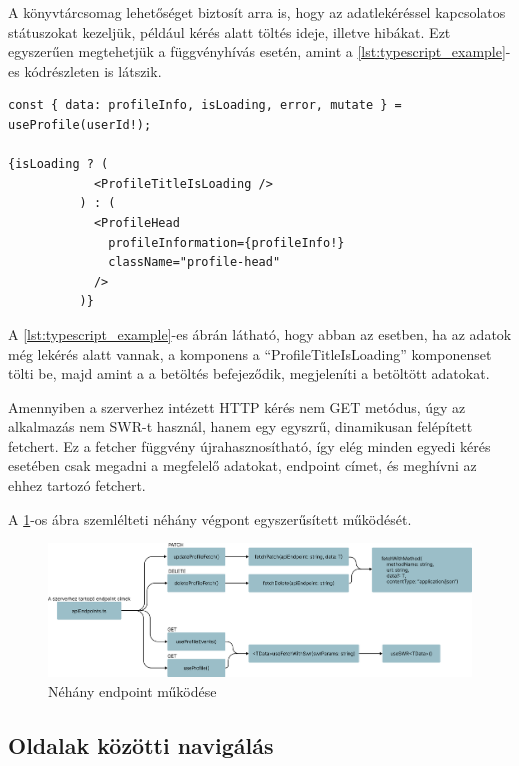 A könyvtárcsomag lehetőséget biztosít arra is, hogy az adatlekéréssel kapcsolatos státuszokat kezeljük, például kérés alatt töltés ideje, illetve hibákat. Ezt egyszerűen megtehetjük a függvényhívás esetén, amint a \ref{lst:typescript_example}-es kódrészleten is látszik.

\clearpage

\begin{lstlisting}[caption={SWR használata profil adatok lekérésére}, label={lst:typescript_example}]
const { data: profileInfo, isLoading, error, mutate } = useProfile(userId!);

{isLoading ? (
            <ProfileTitleIsLoading />
          ) : (
            <ProfileHead
              profileInformation={profileInfo!}
              className="profile-head"
            />
          )}
\end{lstlisting}

A \ref{lst:typescript_example}-es ábrán látható, hogy abban az esetben, ha az adatok még lekérés alatt vannak, a komponens a ``ProfileTitleIsLoading'' komponenset tölti be, majd amint a a betöltés befejeződik, megjeleníti a betöltött adatokat.

Amennyiben a szerverhez intézett HTTP kérés nem GET metódus, úgy az alkalmazás nem SWR-t használ, hanem egy egyszrű, dinamikusan felépített fetchert. Ez a fetcher függvény újrahasznosítható, így elég minden egyedi kérés esetében csak megadni a megfelelő adatokat, endpoint címet, és meghívni az ehhez tartozó fetchert.

A \ref{fig:fetchingData}-os ábra szemlélteti néhány végpont egyszerűsített működését.

\begin{figure}[ht]
  \centering
  \includegraphics[width=\textwidth]{./images/fetchingData.png}
  \caption{Néhány endpoint működése}
  \label{fig:fetchingData}
\end{figure}

\subsection{Oldalak közötti navigálás}

